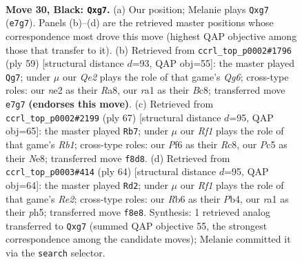 \documentclass[11pt]{article}
\begin{document}
\clearpage

\begin{figure}[p]\centering
\begin{subfigure}{0.46\textwidth}\centering
\resizebox{\linewidth}{!}{%
\newchessgame
\chessboard[
  setfen={2b2r2/p3q1Bk/Pr1pPp2/2pB4/2P3Q1/6P1/4N2K/R4R2 b - - 0 30},
  showmover=false,
  pgfstyle=straightmove, color=movearrow, markmove={e7-g7}
]}
\caption{}
\end{subfigure}\hfill
\begin{subfigure}{0.46\textwidth}\centering
\resizebox{\linewidth}{!}{%
\newchessgame
\chessboard[
  setfen={r1b3k1/pn3p2/B3r2p/2Pp4/1N2p3/2Q2Pq1/P3R1P1/5RK1 b - - 2 30},
  showmover=false,
  pgfstyle=straightmove, color=movearrow, markmove={g3-g7}
]}
\caption{}
\end{subfigure}
\\[4pt]
\begin{subfigure}{0.46\textwidth}\centering
\resizebox{\linewidth}{!}{%
\newchessgame
\chessboard[
  setfen={1rr1n1k1/5pp1/p3p3/3pB3/4qP1Q/2P3RP/P5P1/3R3K b - - 4 34},
  showmover=false,
  pgfstyle=straightmove, color=movearrow, markmove={b8-b7}
]}
\caption{}
\end{subfigure}\hfill
\begin{subfigure}{0.46\textwidth}\centering
\resizebox{\linewidth}{!}{%
\newchessgame
\chessboard[
  setfen={1r4k1/5p2/3p2p1/1P1qb2p/pP1p4/P2Q2PP/1B2RP2/6K1 w - - 2 33},
  showmover=false,
  pgfstyle=straightmove, color=movearrow, markmove={e2-d2}
]}
\caption{}
\end{subfigure}
\caption{\textbf{Move 30, Black: \texttt{Qxg7}.} (a) Our position; Melanie plays \texttt{Qxg7} (\texttt{e7g7}). Panels (b)--(d) are the retrieved master positions whose correspondence most drove this move (highest QAP objective among those that transfer to it). (b) Retrieved from \texttt{ccrl\_top\_p0002\#1796} (ply 59) [structural distance $d$=93, QAP obj=55]: the master played \texttt{Qg7}; under $\mu$ our \emph{Qe2} plays the role of that game's \emph{Qg6}; cross-type roles: our \emph{n}e2 as their \emph{R}a8, our \emph{r}a1 as their \emph{B}c8; transferred move \texttt{e7g7} \textbf{(endorses this move)}. (c) Retrieved from \texttt{ccrl\_top\_p0002\#2199} (ply 67) [structural distance $d$=95, QAP obj=65]: the master played \texttt{Rb7}; under $\mu$ our \emph{Rf1} plays the role of that game's \emph{Rb1}; cross-type roles: our \emph{P}f6 as their \emph{R}c8, our \emph{P}c5 as their \emph{N}e8; transferred move \texttt{f8d8}. (d) Retrieved from \texttt{ccrl\_top\_p0003\#414} (ply 64) [structural distance $d$=95, QAP obj=64]: the master played \texttt{Rd2}; under $\mu$ our \emph{Rf1} plays the role of that game's \emph{Re2}; cross-type roles: our \emph{R}b6 as their \emph{P}b4, our \emph{r}a1 as their \emph{p}h5; transferred move \texttt{f8e8}. Synthesis: 1 retrieved analog transferred to \texttt{Qxg7} (summed QAP objective 55, the strongest correspondence among the candidate moves); Melanie committed it via the \texttt{search} selector.}
\label{fig:thought-m59}
\end{figure}
\end{document}
